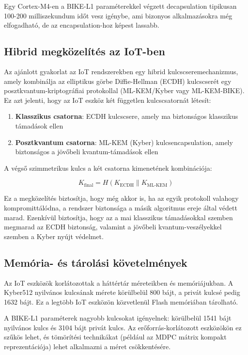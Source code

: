 Egy Cortex-M4-en a BIKE-L1 paraméterekkel végzett decapsulation 
tipikusan 100-200 milliszekundum időt vesz igénybe, ami bizonyos 
alkalmazásokra még elfogadható, de az encapsulation-hoz képest lassabb.

\subsection{Hibrid megközelítés az IoT-ben}

Az ajánlott gyakorlat az IoT rendszerekben egy hibrid kulcscseremechanizmus, 
amely kombinálja az elliptikus görbe Diffie-Hellman (ECDH) kulcscserét 
egy posztkvantum-kriptográfiai protokollal (ML-KEM/Kyber vagy ML-KEM-BIKE). 
Ez azt jelenti, hogy az IoT eszköz két független kulcscsatornát létesít:

\begin{enumerate}
    \item \textbf{Klasszikus csatorna}: ECDH kulcscsere, amely ma biztonságos 
        klasszikus támadások ellen
    \item \textbf{Posztkvantum csatorna}: ML-KEM (Kyber) kulcsencapsulation, 
        amely biztonságos a jövőbeli kvantum-támadások ellen
\end{enumerate}

A végső szimmetrikus kulcs a két csatorna kimenetének kombinációja:

$$K_{\text{final}} = H(K_{\text{ECDH}} \| K_{\text{ML-KEM}})$$

Ez a megközelítés biztosítja, hogy még akkor is, ha az egyik protokoll 
valahogy kompromittálódna, a rendszer biztonsága a másik algoritmus 
ereje által védett marad. Ezenkívül biztosítja, hogy az a mai klasszikus 
támadásokkal szemben megmarad az ECDH biztonság, valamint a jövőbeli 
kvantum-veszélyekkel szemben a Kyber nyújt védelmet.

\subsection{Memória- és tárolási követelmények}

Az IoT eszközök korlátozottak a háttértár méreteikben és memóriájukban. 
A Kyber512 nyilvános kulcsának mérete körülbelül 800 bájt, 
a privát kulcsé pedig 1632 bájt. Ez a legtöbb IoT eszközön 
közvetlenül Flash memóriában tárolható.

A BIKE-L1 paraméterek nagyobb kulcsokat igényelnek: körülbelül 
1541 bájt nyilvános kulcs és 3104 bájt privát kulcs. 
Az erőforrás-korlátozott eszközökön ez szűkös lehet, és tömörítési 
technikákat (például az MDPC mátrix kompakt reprezentációja) lehet 
alkalmazni a méret csökkentésére.

